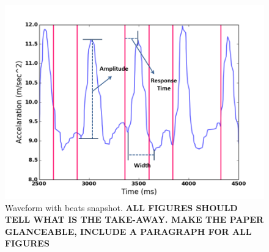 \begin{figure}
\includegraphics[width=\columnwidth]{figure/waveform_resp.png}
\centering
\caption{\label{fig:waveform}Waveform with beats snapshot. \textbf{ALL FIGURES SHOULD TELL WHAT IS THE TAKE-AWAY. MAKE THE PAPER GLANCEABLE, INCLUDE A PARAGRAPH FOR ALL FIGURES}}
\end{figure}

